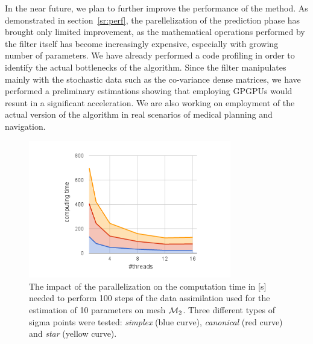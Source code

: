 In the near future, we plan to further improve the performance of the method. As demonstrated in section~\ref{sr:perf}, 
the parellelization of the prediction phase has brought only limited improvement, as the mathematical operations 
performed by the filter itself has become increasingly expensive, especially with growing number of parameters. 
We have already performed a code profiling in order to identify the actual bottlenecks of the algorithm. 
Since the filter manipulates mainly with the stochastic data such as the co-variance dense matrices, we have
performed a preliminary estimations showing that employing GPGPUs would resunt in a significant acceleration.
We are also working on employment of the actual version of the algorithm in real scenarios of medical planning and navigation.

\begin{figure}[t!]%
\includegraphics[height=6cm]{figs/cyl10parallel.png}
\caption{The impact of the parallelization on the computation time in [s] needed to perform 100 steps of the data assimilation used for 
the estimation of 10 parameters on mesh $\mathcal{M}_2$. Three different types of sigma points were tested: \emph{simplex} (blue curve), 
\emph{canonical} (red curve) and \emph{star} (yellow curve).}
\label{f:parallel}
\end{figure}
